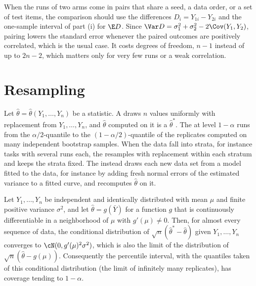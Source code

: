 \begin{refsection}
When the runs of two arms come in pairs that share a seed, a data order, or a set of test items, the comparison should use the differences $D_i=Y_{1i}-Y_{2i}$ and the one-sample interval of part (i) for $\E D$. Since $\Var D=\sigma_1^2+\sigma_2^2-2\Cov(Y_1,Y_2)$, pairing lowers the standard error whenever the paired outcomes are positively correlated, which is the usual case. It costs degrees of freedom, $n-1$ instead of up to $2n-2$, which matters only for very few runs or a weak correlation.

\section{Resampling}\label{sec:toolkit:resampling}

\begin{definition}\label{def:toolkit:bootstrap}
Let $\hat\theta=\hat\theta(Y_1,\dots,Y_n)$ be a statistic. A  draws $n$ values uniformly with replacement from $Y_1,\dots,Y_n$, and $\hat\theta$ computed on it is a  $\hat\theta^*$. The  at level $1-\alpha$ runs from the $\alpha/2$-quantile to the $(1-\alpha/2)$-quantile of the replicates computed on many independent bootstrap samples. When the data fall into strata, for instance tasks with several runs each, the  resamples with replacement within each stratum and keeps the strata fixed. The  instead draws each new data set from a model fitted to the data, for instance by adding fresh normal errors of the estimated variance to a fitted curve, and recomputes $\hat\theta$ on it.
\end{definition}

\begin{theorem}\label{thm:toolkit:bootstrap}
Let $Y_1,\dots,Y_n$ be independent and identically distributed with mean $\mu$ and finite positive variance $\sigma^2$, and let $\hat\theta=g(\bar Y)$ for a function $g$ that is continuously differentiable in a neighborhood of $\mu$ with $g'(\mu)\ne0$. Then, for almost every sequence of data, the conditional distribution of $\sqrt n(\hat\theta^*-\hat\theta)$ given $Y_1,\dots,Y_n$ converges to $\cN(0,g'(\mu)^2\sigma^2)$, which is also the limit of the distribution of $\sqrt n(\hat\theta-g(\mu))$. Consequently the percentile interval, with the quantiles taken of this conditional distribution (the limit of infinitely many replicates), has coverage tending to $1-\alpha$.
\end{theorem}


\end{refsection}
